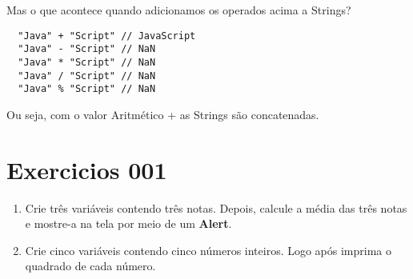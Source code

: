Mas o que acontece quando adicionamos os operados acima a Strings? 

\begin{lstlisting}
  "Java" + "Script" // JavaScript 
  "Java" - "Script" // NaN
  "Java" * "Script" // NaN
  "Java" / "Script" // NaN
  "Java" % "Script" // NaN
\end{lstlisting}

Ou seja, com o valor Aritmético + as Strings são concatenadas.

\section{Exercicios 001}

\begin{enumerate}
  \item Crie três variáveis contendo três notas. Depois, calcule a média das três notas e mostre-a na tela por meio de um \textbf{Alert}.  
  \item Crie cinco variáveis contendo cinco números inteiros. Logo após imprima o quadrado de cada número.
\end{enumerate}


